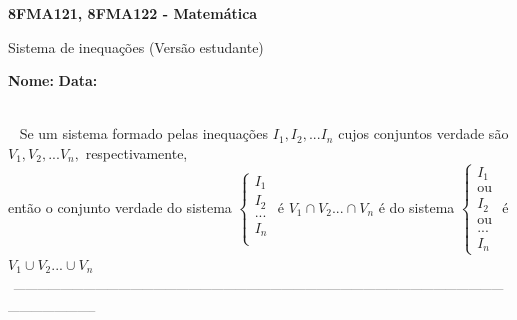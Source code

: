 \documentclass[a4paper,14pt]{article}
\begin{document}
	
	\noindent\textbf{8FMA121, 8FMA122 - Matemática} 
	
	\begin{center}Sistema de inequações (Versão estudante)
	\end{center}
	
	\noindent\textbf{Nome:} \underline{\hspace{10cm}}
	\noindent\textbf{Data:} \underline{\hspace{4cm}}
	
	~ \\ ~
	\noindent Se um sistema formado pelas inequações $I_1, I_2, ... I_n$ cujos conjuntos verdade são $V_1, V_2, ... V_n,$ respectivamente, \\ então o conjunto verdade do sistema $\begin{cases} 
		I_1 \\
		I_2 \\
		... \\
		I_n \\
	\end{cases}$
	é $V_1 \cap V_2 ... \cap V_n$ é do sistema $\begin{cases} 
		I_1 \\
		\text{ou} \\
		I_2 \\
		\text{ou} \\
		... \\
		I_n
		\end{cases}$
	é $V_1 \cup V_2 ... \cup V_n$
		\\
	\noindent\textsubscript{~-----------------------------------------------------------------------------------------------------------------------------------------------------}	
\end{document}
